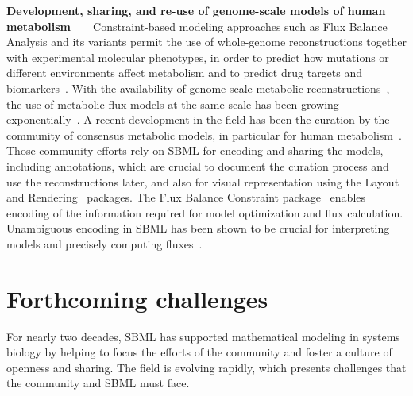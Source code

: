 \documentclass{sbml-paper}
\begin{document}
\textbf{Development, sharing, and re-use of genome-scale models of human metabolism}~~~~Constraint-based modeling approaches such as Flux Balance Analysis and its variants permit the use of whole-genome reconstructions together with experimental molecular phenotypes, in order to predict how mutations or different environments affect metabolism and to predict drug targets and biomarkers~\citep{savinell1992network, obrien2015}.  With the availability of genome-scale metabolic reconstructions~\citep{edwards1999systems}, the use of metabolic flux models at the same scale has been growing exponentially~\citep{Bordbar2014a}. A recent development in the field has been the curation by the community of consensus metabolic models, in particular for human metabolism~\citep{brunk2018}. Those community efforts rely on SBML for encoding and sharing the models, including annotations, which are crucial to document the curation process and use the reconstructions later, and also for visual representation using the Layout~\citep{Gauges2015} and Rendering~\citep{Bergmann2018sbml} packages. The Flux Balance Constraint package~\citep{Olivier2018a} enables encoding of the information required for model optimization and flux calculation.  Unambiguous encoding in SBML has been shown to be crucial for interpreting models and precisely computing fluxes~\citep{Ebrahim2015, Ravikrishnan2015critical}.

\hrulefill
\newpage

\section*{Forthcoming challenges}

For nearly two decades, SBML has supported mathematical modeling in systems biology by helping to focus the efforts of the community and foster a culture of openness and sharing.  The field is evolving rapidly, which presents challenges that the community and SBML must face.
\end{document}
